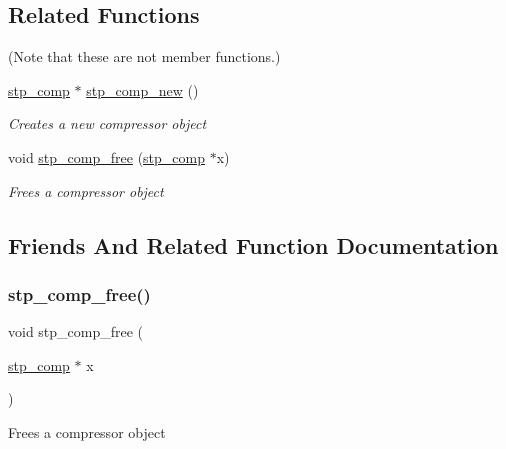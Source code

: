 \subsection*{Related Functions}
(Note that these are not member functions.) \begin{DoxyCompactItemize}
\item 
\mbox{\hyperlink{structstp__comp}{stp\+\_\+comp}} $\ast$ \mbox{\hyperlink{structstp__comp_adcecb43a5505c7a62ff01747b89cba1c}{stp\+\_\+comp\+\_\+new}} ()
\begin{DoxyCompactList}\small\item\em Creates a new compressor object~\newline
 \end{DoxyCompactList}\item 
void \mbox{\hyperlink{structstp__comp_a250b6965bb5bba02f74852c81d351e6b}{stp\+\_\+comp\+\_\+free}} (\mbox{\hyperlink{structstp__comp}{stp\+\_\+comp}} $\ast$x)
\begin{DoxyCompactList}\small\item\em Frees a compressor object~\newline
 \end{DoxyCompactList}\end{DoxyCompactItemize}


\subsection{Friends And Related Function Documentation}
\mbox{\label{structstp__comp_a250b6965bb5bba02f74852c81d351e6b}} 
\subsubsection{\texorpdfstring{stp\+\_\+comp\+\_\+free()}{stp\_comp\_free()}}
{\footnotesize\ttfamily void stp\+\_\+comp\+\_\+free (\begin{DoxyParamCaption}\item[{\mbox{\hyperlink{structstp__comp}{stp\+\_\+comp}} $\ast$}]{x }\end{DoxyParamCaption})\hspace{0.3cm}{\ttfamily [related]}}



Frees a compressor object~\newline
 


